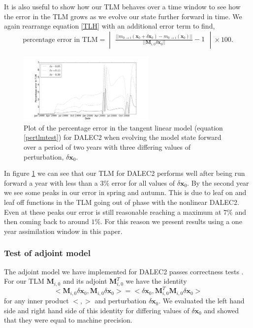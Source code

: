 \documentclass[11pt]{article}
\begin{document}
It is also useful to show how our TLM behaves over a time window to see how the error in the TLM grows as we evolve our state further forward in time. We again rearrange equation \ref{TLH} with an additional error term to find, 
\begin{equation}
\text{percentage error in TLM} = \begin{vmatrix} \frac{||m_{0\rightarrow i}(\mathbf{x}_0+\delta\mathbf{x}_0) - m_{0 \rightarrow i}(\mathbf{x}_0)||}{|| \mathbf{M}_{i,0}\delta\mathbf{x}_0||} - 1 \end{vmatrix} \times 100. \label{pertlmtest}
\end{equation}

\begin{figure}[ht]
    \centering
    \includegraphics[width=0.6\textwidth]{tlm_error.png}
    \caption{Plot of the percentage error in the tangent linear model (equation \ref{pertlmtest}) for DALEC2 when evolving the model state forward over a period of two years with three differing values of perturbation, $\delta \textbf{x}_0$.}
    \label{fig:tlm_error}
\end{figure}

In figure \ref{fig:tlm_error} we can see that our TLM for DALEC2 performs well after being run forward a year with less than a $3\%$ error for all values of $\delta \textbf{x}_0$. By the second year we see some peaks in our error in spring and autumn. This is due to leaf on and leaf off functions in the TLM going out of phase with the nonlinear DALEC2. Even at these peaks our error is still reasonable reaching a maximum at $7\%$ and then coming back to around $1\%$. For this reason we present results using a one year assimilation window in this paper. 

\subsubsection{Test of adjoint model} 

The adjoint model we have implemented for DALEC2 passes correctness tests \citep{lawless2013}. For our TLM $\mathbf{M}_{i,0}$ and its adjoint $\mathbf{M}_{i,0}^{T}$ we have the identity
\begin{equation}
<\mathbf{M}_{i,0}\delta\textbf{x}_0, \mathbf{M}_{i,0}\delta\textbf{x}_0> = <\delta\textbf{x}_0, \mathbf{M}_{i,0}^{T}\mathbf{M}_{i,0}\delta\textbf{x}_0>
\end{equation}
for any inner product $<, >$ and perturbation $\delta \textbf{x}_0$. We evaluated the left hand side and right hand side of this identity for differing values of $\delta \textbf{x}_0$ and showed that they were equal to machine precision.
\end{document}
